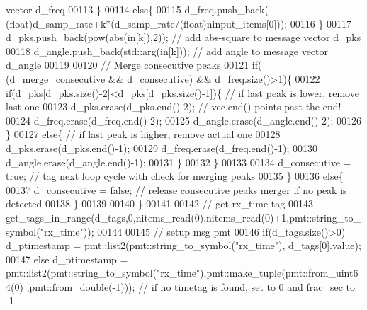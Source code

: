 \begin{DoxyCode}
{       vector d\_freq}
00113                 \}
00114                 \textcolor{keywordflow}{else}\{
00115                     d_freq.push\_back(-(\textcolor{keywordtype}{float})d_samp_rate+k*(d_samp_rate/(\textcolor{keywordtype}{float})ninput\_items[0]));
00116                 \}
00117                 d_pks.push\_back(pow(abs(in[k]),2)); \textcolor{comment}{// add abs-square to message vector d\_pks}
00118                 d_angle.push\_back(std::arg(in[k])); \textcolor{comment}{// add angle to message vector d\_angle}
00119                 
00120                 \textcolor{comment}{// Merge consecutive peaks}
00121                 \textcolor{keywordflow}{if}( (d_merge_consecutive && d_consecutive) && d_freq.size()>1)\{
00122                     \textcolor{keywordflow}{if}(d_pks[d_pks.size()-2]<d_pks[d_pks.size()-1])\{ \textcolor{comment}{// if last peak is lower, remove last
       one}
00123                         d_pks.erase(d_pks.end()-2); \textcolor{comment}{// vec.end() points past the end!}
00124                         d_freq.erase(d_freq.end()-2);
00125                         d_angle.erase(d_angle.end()-2);
00126                     \}
00127                     \textcolor{keywordflow}{else}\{ \textcolor{comment}{// if last peak is higher, remove actual one}
00128                         d_pks.erase(d_pks.end()-1);
00129                         d_freq.erase(d_freq.end()-1);
00130                         d_angle.erase(d_angle.end()-1);
00131                     \}
00132                 \}
00133                 
00134                 d_consecutive = \textcolor{keyword}{true}; \textcolor{comment}{// tag next loop cycle with check for merging peaks}
00135             \}
00136             \textcolor{keywordflow}{else}\{
00137                 d_consecutive = \textcolor{keyword}{false}; \textcolor{comment}{// release consecutive peaks merger if no peak is detected}
00138             \}
00139             
00140         \}
00141         
00142         \textcolor{comment}{// get rx\_time tag}
00143         get\_tags\_in\_range(d_tags,0,nitems\_read(0),nitems\_read(0)+1,pmt::string\_to\_symbol(\textcolor{stringliteral}{"rx\_time"}));
00144         
00145         \textcolor{comment}{// setup msg pmt}
00146         \textcolor{keywordflow}{if}(d_tags.size()>0) d_ptimestamp = pmt::list2(pmt::string\_to\_symbol(\textcolor{stringliteral}{"rx\_time"}),
      d_tags[0].value);
00147         \textcolor{keywordflow}{else} d_ptimestamp = pmt::list2(pmt::string\_to\_symbol(\textcolor{stringliteral}{"rx\_time"}),pmt::make\_tuple(pmt::from\_uint64(0)
      ,pmt::from\_double(-1))); \textcolor{comment}{// if no timetag is found, set to 0 and frac\_sec to -1}

\end{DoxyCode}
